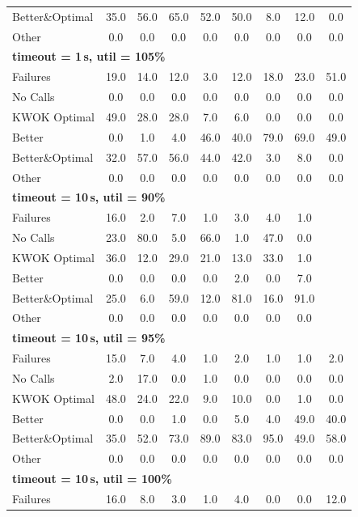 \begin{tabular}{l cccccccc}
Better\&Optimal & 35.0 & 56.0 & 65.0 & 52.0 & 50.0 & 8.0 & 12.0 & 0.0 \\
Other & 0.0 & 0.0 & 0.0 & 0.0 & 0.0 & 0.0 & 0.0 & 0.0 \\
\midrule
\multicolumn{9}{l}{\textbf{timeout = 1\,s, util = 105\%}} \\
\midrule
Failures & 19.0 & 14.0 & 12.0 & 3.0 & 12.0 & 18.0 & 23.0 & 51.0 \\
No Calls & 0.0 & 0.0 & 0.0 & 0.0 & 0.0 & 0.0 & 0.0 & 0.0 \\
KWOK Optimal & 49.0 & 28.0 & 28.0 & 7.0 & 6.0 & 0.0 & 0.0 & 0.0 \\
Better & 0.0 & 1.0 & 4.0 & 46.0 & 40.0 & 79.0 & 69.0 & 49.0 \\
Better\&Optimal & 32.0 & 57.0 & 56.0 & 44.0 & 42.0 & 3.0 & 8.0 & 0.0 \\
Other & 0.0 & 0.0 & 0.0 & 0.0 & 0.0 & 0.0 & 0.0 & 0.0 \\
\midrule
\multicolumn{9}{l}{\textbf{timeout = 10\,s, util = 90\%}} \\
\midrule
Failures & 16.0 & 2.0 & 7.0 & 1.0 & 3.0 & 4.0 & 1.0 & \text{--} \\
No Calls & 23.0 & 80.0 & 5.0 & 66.0 & 1.0 & 47.0 & 0.0 & \text{--} \\
KWOK Optimal & 36.0 & 12.0 & 29.0 & 21.0 & 13.0 & 33.0 & 1.0 & \text{--} \\
Better & 0.0 & 0.0 & 0.0 & 0.0 & 2.0 & 0.0 & 7.0 & \text{--} \\
Better\&Optimal & 25.0 & 6.0 & 59.0 & 12.0 & 81.0 & 16.0 & 91.0 & \text{--} \\
Other & 0.0 & 0.0 & 0.0 & 0.0 & 0.0 & 0.0 & 0.0 & \text{--} \\
\midrule
\multicolumn{9}{l}{\textbf{timeout = 10\,s, util = 95\%}} \\
\midrule
Failures & 15.0 & 7.0 & 4.0 & 1.0 & 2.0 & 1.0 & 1.0 & 2.0 \\
No Calls & 2.0 & 17.0 & 0.0 & 1.0 & 0.0 & 0.0 & 0.0 & 0.0 \\
KWOK Optimal & 48.0 & 24.0 & 22.0 & 9.0 & 10.0 & 0.0 & 1.0 & 0.0 \\
Better & 0.0 & 0.0 & 1.0 & 0.0 & 5.0 & 4.0 & 49.0 & 40.0 \\
Better\&Optimal & 35.0 & 52.0 & 73.0 & 89.0 & 83.0 & 95.0 & 49.0 & 58.0 \\
Other & 0.0 & 0.0 & 0.0 & 0.0 & 0.0 & 0.0 & 0.0 & 0.0 \\
\midrule
\multicolumn{9}{l}{\textbf{timeout = 10\,s, util = 100\%}} \\
\midrule
Failures & 16.0 & 8.0 & 3.0 & 1.0 & 4.0 & 0.0 & 0.0 & 12.0 \\

\end{tabular}
